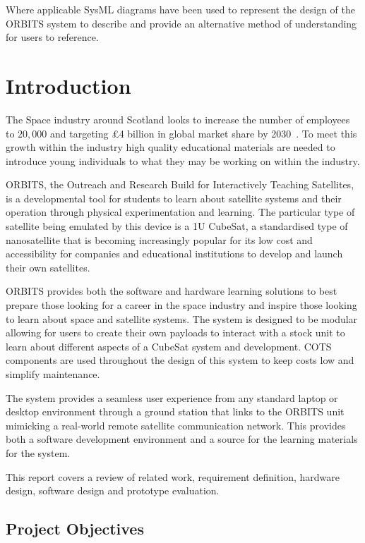 \documentclass[a4paper,12pt,titlepage]{report}
\begin{document}
Where applicable SysML diagrams have been used to represent the design of the ORBITS system to describe and provide an alternative method of understanding for users to reference.

\chapter{Introduction}

The Space industry around Scotland looks to increase the number of employees to \(20,000\) and targeting \pounds 4 billion in global market share by 2030~\cite{govScot}. To meet this growth within the industry high quality educational materials are needed to introduce young individuals to what they may be working on within the industry.

ORBITS, the Outreach and Research Build for Interactively Teaching Satellites, is a developmental tool for students to learn about satellite systems and their operation through physical experimentation and learning. The particular type of satellite being emulated by this device is a 1U CubeSat, a standardised type of nanosatellite that is becoming increasingly popular for its low cost and accessibility for companies and educational institutions to develop and launch their own satellites.

ORBITS provides both the software and hardware learning solutions to best prepare those looking for a career in the space industry and inspire those looking to learn about space and satellite systems. The system is designed to be modular allowing for users to create their own payloads to interact with a stock unit to learn about different aspects of a CubeSat system and development. COTS components are used throughout the design of this system to keep costs low and simplify maintenance. 

The system provides a seamless user experience from any standard laptop or desktop environment through a ground station that links to the ORBITS unit mimicking a real-world remote satellite communication network. This provides both a software development environment and a source for the learning materials for the system.

This report covers a review of related work, requirement definition, hardware design, software design and prototype evaluation.

\section{Project Objectives}
\end{document}
